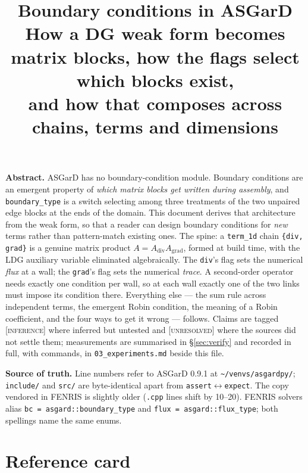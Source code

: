 \documentclass[10pt]{article}
\title{\vspace{-10mm}\textbf{Boundary conditions in ASGarD}\\[0.5mm]
\normalsize How a DG weak form becomes matrix blocks, how the flags select which
blocks exist,\\ and how that composes across chains, terms and dimensions}
\author{}\date{}
\newcommand{\code}[1]{\texttt{#1}}
\newcommand{\INF}{\textcolor{red!60!black}{\textsc{[inference]}}}
\newcommand{\UNR}{\textcolor{red!60!black}{\textsc{[unresolved]}}}
\begin{document}
\maketitle
\vspace{-14mm}

{\small
\textbf{Abstract.} ASGarD has no boundary-condition module. Boundary conditions
are an emergent property of \emph{which matrix blocks get written during
assembly}, and \code{boundary\_type} is a switch selecting among three treatments
of the two unpaired edge blocks at the ends of the domain. This document derives
that architecture from the weak form, so that a reader can design boundary
conditions for \emph{new} terms rather than pattern-match existing ones. The
spine: a \code{term\_1d} chain \code{\{div, grad\}} is a genuine matrix product
$A=A_{\mathrm{div}}A_{\mathrm{grad}}$, formed at build time, with the LDG
auxiliary variable eliminated algebraically. The \code{div}'s flag sets the
numerical \emph{flux} at a wall; the \code{grad}'s flag sets the numerical
\emph{trace}. A second-order operator needs exactly one condition per wall, so at
each wall exactly one of the two links must impose its condition there.
Everything else --- the sum rule across independent terms, the emergent Robin
condition, the meaning of a Robin coefficient, and the four ways to get it wrong
--- follows. Claims are tagged \INF{} where inferred but untested and \UNR{}
where the sources did not settle them; measurements are summarised in
\S\ref{sec:verify} and recorded in full, with commands, in
\code{03\_experiments.md} beside this file.

\textbf{Source of truth.} Line numbers refer to ASGarD 0.9.1 at
\code{\textasciitilde/venvs/asgardpy/}; \code{include/} and \code{src/} are
byte-identical apart from \code{assert}$\leftrightarrow$\code{expect}. The copy
vendored in FENRIS is slightly older (\code{.cpp} lines shift by 10--20). FENRIS
solvers alias \code{bc = asgard::boundary\_type} and
\code{flux = asgard::flux\_type}; both spellings name the same enums.
}

\section{Reference card}
\label{sec:card}
\end{document}
